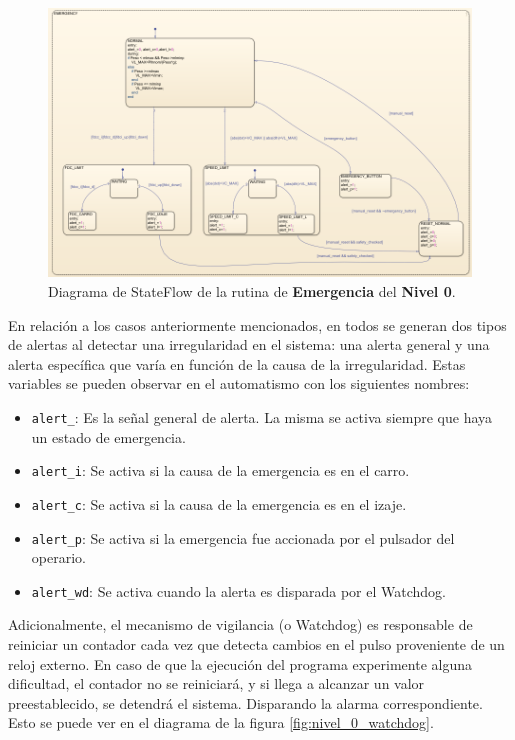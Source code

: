 \documentclass[11pt]{article}
\begin{document}
\begin{figure}[!h]
	\centering
	\includegraphics[width=1\textwidth]{images/imagen_27_emergencia.png}
	\caption{Diagrama de StateFlow de la rutina de \textbf{Emergencia} del \textbf{Nivel 0}.}
	\label{fig:nivel_0_emergencia}
\end{figure}

En relación a los casos anteriormente mencionados, en todos se generan dos tipos de alertas al detectar una irregularidad en el sistema: una alerta general y una alerta específica que varía en función de la causa de la irregularidad. Estas variables se pueden observar en el automatismo con los siguientes nombres:

\begin{itemize}
	\item \texttt{alert\_}: Es la señal general de alerta. La misma se activa siempre que haya un estado de emergencia.
	\item \texttt{alert\_i}: Se activa si la causa de la emergencia es en el carro.
	\item \texttt{alert\_c}: Se activa si la causa de la emergencia es en el izaje.
	\item \texttt{alert\_p}: Se activa si la emergencia fue accionada por el pulsador del operario.
	\item \texttt{alert\_wd}: Se activa cuando la alerta es disparada por el Watchdog.
\end{itemize}

Adicionalmente, el mecanismo de vigilancia (o Watchdog) es responsable de reiniciar un contador cada vez que detecta cambios en el pulso proveniente de un reloj externo. En caso de que la ejecución del programa experimente alguna dificultad, el contador no se reiniciará, y si llega a alcanzar un valor preestablecido, se detendrá el sistema. Disparando la alarma correspondiente. Esto se puede ver en el diagrama de la figura \ref{fig:nivel_0_watchdog}.
\end{document}
